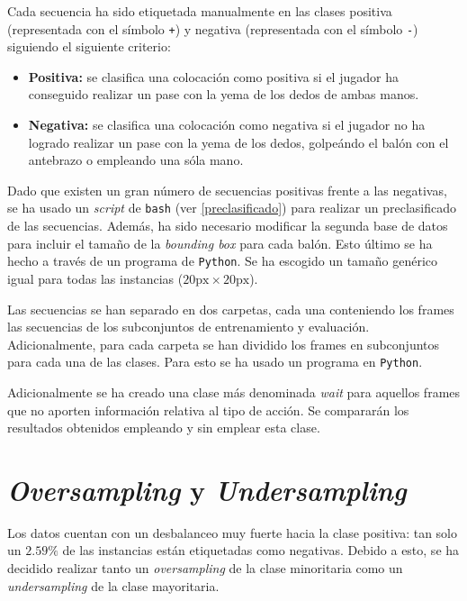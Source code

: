 \documentclass[12pt]{report} %
\begin{document}
    Cada secuencia ha sido etiquetada manualmente en las clases positiva
    (representada con el símbolo \verb!+!) y negativa (representada con el
    símbolo \verb!-!) siguiendo el siguiente criterio:
    \begin{itemize}
        \item \textbf{Positiva:} se clasifica una colocación como positiva si
        el jugador ha conseguido realizar un pase con la yema de los dedos de
        ambas manos.
        \item \textbf{Negativa:} se clasifica una colocación como negativa si
        el jugador no ha logrado realizar un pase con la yema de los dedos,
        golpeándo el balón con el antebrazo o empleando una sóla mano.
    \end{itemize}
    
    Dado que existen un gran número de secuencias positivas frente a las
    negativas, se ha usado un \textit{script} de \texttt{bash} (ver
    \ref{preclasificado}) para realizar un preclasificado de las secuencias.
    Además, ha sido necesario modificar la segunda base de datos para incluir
    el tamaño de la \textit{bounding box} para cada balón. Esto último se ha
    hecho a través de un programa de \texttt{Python}. Se ha escogido un 
    tamaño genérico igual para todas las instancias ($20\text{px}\times20\text{px}$).

    Las secuencias se han separado en dos carpetas, cada una conteniendo los
    frames las secuencias de los subconjuntos de entrenamiento y evaluación.
    Adicionalmente, para cada carpeta se han dividido los frames en subconjuntos
    para cada una de las clases. Para esto se ha usado un programa en \texttt{Python}.

    Adicionalmente se ha creado una clase más denominada \textit{wait} para
    aquellos frames que no aporten información relativa al tipo de acción. Se
    compararán los resultados obtenidos empleando y sin emplear esta clase.

    \section{\textit{Oversampling} y \textit{Undersampling}}

    Los datos cuentan con un desbalanceo muy fuerte hacia la clase positiva: tan
    solo un $2.59\%$ de las instancias están etiquetadas como negativas. Debido
    a esto, se ha decidido realizar tanto un \textit{oversampling} de la clase
    minoritaria como un \textit{undersampling} de la clase mayoritaria. 
\end{document}
